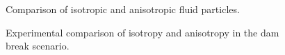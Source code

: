 \documentclass[times,twocolumn,final]{elsarticle}
\begin{document}
\begin{figure}[!t]
    \centering
    \caption{Comparison of isotropic and anisotropic fluid particles.}
    \label{fig:figure3}
\end{figure}

\begin{figure}[!t]
    \centering
    \caption{Experimental comparison of isotropy and anisotropy in the dam break scenario.}
    \label{fig:figure4}
\end{figure}
\end{document}
